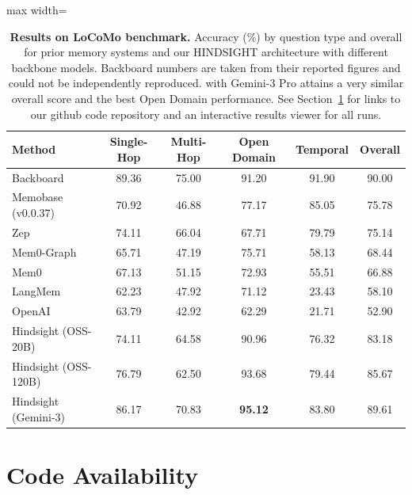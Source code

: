 \begin{table}[t]
\centering
\renewcommand{\arraystretch}{1.3}
\begin{adjustbox}{max width=\textwidth}
\begin{tabular}{l|ccccc}
\hline
\textbf{Method} & \textbf{Single-Hop} & \textbf{Multi-Hop} & \textbf{Open Domain} & \textbf{Temporal} & \textbf{Overall} \\
\hline
Backboard                & 89.36 & 75.00 & 91.20 & 91.90 & 90.00 \\
Memobase (v0.0.37)       & 70.92 & 46.88 & 77.17 & 85.05 & 75.78 \\
Zep                      & 74.11 & 66.04 & 67.71 & 79.79 & 75.14 \\
Mem0-Graph               & 65.71 & 47.19 & 75.71 & 58.13 & 68.44 \\
Mem0                     & 67.13 & 51.15 & 72.93 & 55.51 & 66.88 \\
LangMem                  & 62.23 & 47.92 & 71.12 & 23.43 & 58.10 \\
OpenAI                   & 63.79 & 42.92 & 62.29 & 21.71 & 52.90 \\
\hline
Hindsight (OSS-20B)      & 74.11 & 64.58 & 90.96 & 76.32 & 83.18 \\
Hindsight (OSS-120B)     & 76.79 & 62.50 & 93.68 & 79.44 & 85.67 \\
Hindsight (Gemini-3)     & 86.17 & 70.83 & \textbf{95.12} & 83.80 & 89.61 \\
\hline
\end{tabular}
\end{adjustbox}
\caption{\textbf{Results on LoCoMo benchmark.} Accuracy (\%) by question type and overall for prior memory systems and our HINDSIGHT architecture with different backbone models. Backboard numbers are taken from their reported figures and could not be independently reproduced. \our with Gemini-3 Pro attains a very similar overall score and the best Open Domain performance. See Section~\ref{sec:code-availability} for links to our github code repository and an interactive results viewer for all \our runs.}

\label{tab:locomo_results}
\end{table}

\section{Code Availability}
\label{sec:code-availability}

